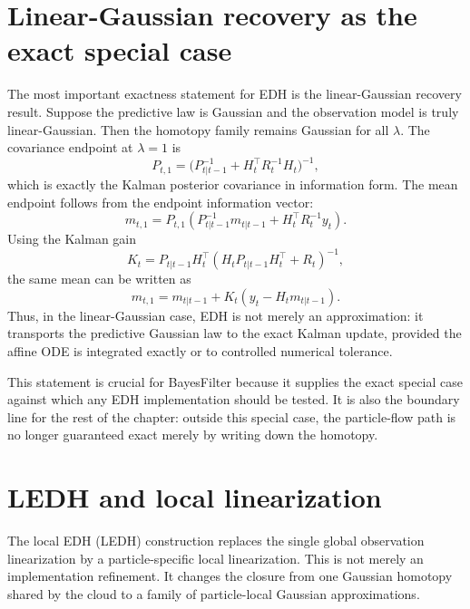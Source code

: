 \section{Linear-Gaussian recovery as the exact special case}
\label{sec:bf-pff-linear-gaussian-recovery}

The most important exactness statement for EDH is the linear-Gaussian recovery
result.  Suppose the predictive law is Gaussian and the observation model is
truly linear-Gaussian.  Then the homotopy family remains Gaussian for all
$\lambda$.  The covariance endpoint at $\lambda=1$ is
\begin{equation}
\label{eq:bf-pff-kalman-endpoint}
  P_{t,1} = \bigl(P_{t|t-1}^{-1} + H_t^\top R_t^{-1}H_t\bigr)^{-1},
\end{equation}
which is exactly the Kalman posterior covariance in information form.  The mean
endpoint follows from the endpoint information vector:
\begin{equation}
\label{eq:bf-pff-kalman-mean-endpoint}
  m_{t,1}
  =
  P_{t,1}
  \left(
    P_{t|t-1}^{-1}m_{t|t-1}
    + H_t^\top R_t^{-1}y_t
  \right).
\end{equation}
Using the Kalman gain
\[
  K_t=P_{t|t-1}H_t^\top
  (H_tP_{t|t-1}H_t^\top+R_t)^{-1},
\]
the same mean can be written as
\[
  m_{t,1}
  =
  m_{t|t-1}+K_t(y_t-H_tm_{t|t-1}).
\]
Thus, in the linear-Gaussian case, EDH is not merely an approximation: it
transports the predictive Gaussian law to the exact Kalman update, provided the
affine ODE is integrated exactly or to controlled numerical tolerance.

This statement is crucial for BayesFilter because it supplies the exact special
case against which any EDH implementation should be tested.  It is also the
boundary line for the rest of the chapter: outside this special case, the
particle-flow path is no longer guaranteed exact merely by writing down the
homotopy.

\section{LEDH and local linearization}
\label{sec:bf-pff-ledh}

The local EDH (LEDH) construction replaces the single global observation
linearization by a particle-specific local linearization.  This is not merely
an implementation refinement.  It changes the closure from one Gaussian
homotopy shared by the cloud to a family of particle-local Gaussian
approximations.

